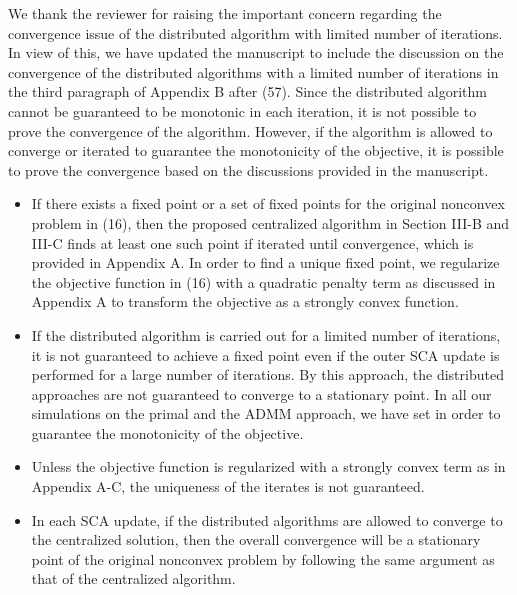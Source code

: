 \begin{enumerate}
\resp We thank the reviewer for raising the important concern regarding the convergence issue of the distributed algorithm with limited number of iterations. In view of this, we have updated the manuscript to include the discussion on the convergence of the distributed algorithms with a limited number of iterations in the third paragraph of Appendix B after (57). Since the distributed algorithm cannot be guaranteed to be monotonic in each iteration, it is not possible to prove the convergence of the algorithm. However, if the algorithm is allowed to converge or iterated to guarantee the monotonicity of the objective, it is possible to prove the convergence based on the discussions provided in the manuscript. 
\begin{itemize}
\item If there exists a fixed point or a set of fixed points for the original nonconvex problem in (16), then the proposed centralized algorithm in Section III-B and III-C finds at least one such point if iterated until convergence, which is provided in Appendix A. In order to find a unique fixed point, we regularize the objective function in (16) with a quadratic penalty term as discussed in Appendix A to transform the objective as a strongly convex function.
\item If the distributed algorithm is carried out for a limited number of iterations, it is not guaranteed to achieve a fixed point even if the outer \ac{SCA} update is performed for a large number of iterations. By this approach, the distributed approaches are not guaranteed to converge to a stationary point. In all our simulations on the primal and the \ac{ADMM} approach, we have set  in order to guarantee the monotonicity of the objective.
\item Unless the objective function is regularized with a strongly convex term as in Appendix A-C, the uniqueness of the iterates is not guaranteed. 
\item In each \ac{SCA} update, if the distributed algorithms are allowed to converge to the centralized solution, then the overall convergence will be a stationary point of the original nonconvex problem by following the same argument as that of the centralized algorithm.

\end{itemize}
\end{enumerate}
